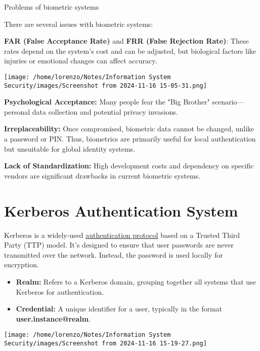 \begin{quotebox-red}{Problems of biometric systems}{
    There are several issues with biometric systems:
    \begin{itemize}
        \begin{minipage}{0.7\textwidth}
        \item \textbf{FAR (False Acceptance Rate)} and \textbf{FRR (False Rejection Rate)}: These rates depend on the system's cost and can be adjusted, but biological factors like injuries or emotional changes can affect accuracy.
        \end{minipage} 
        \hspace{-1.2cm}
        \begin{minipage}{0.4\textwidth}
            \centering
            \texttt{[image: /home/lorenzo/Notes/Information System Security/images/Screenshot from 2024-11-16 15-05-31.png]}
        \end{minipage}
        
        \item \textbf{Psychological Acceptance:} Many people fear the "Big Brother" scenario—personal data collection and potential privacy invasions.
        \item \textbf{Irreplaceability:} Once compromised, biometric data cannot be changed, unlike a password or PIN. Thus, biometrics are primarily useful for local authentication but unsuitable for global identity systems.
        \item \textbf{Lack of Standardization:} High development costs and dependency on specific vendors are significant drawbacks in current biometric systems.
    \end{itemize}}
\end{quotebox-red}
\newpage
\section{Kerberos Authentication System}
\begin{minipage}{0.8\textwidth}
\vspace{-0.5cm}
Kerberos is a widely-used \underline{authentication protocol} based on a Trusted Third Party (TTP) model. It's designed to ensure that user passwords are never transmitted over the network. Instead, the password is used locally for encryption.
\begin{itemize}
    \item \textbf{Realm:} Refers to a Kerberos domain, grouping together all systems that use Kerberos for authentication.
    \item \textbf{Credential:} A unique identifier for a user, typically in the format \textbf{user.instance@realm}.
    \end{itemize}
\end{minipage} 
\hspace{-1.2cm}
\begin{minipage}{0.3\textwidth}
    \centering
    \texttt{[image: /home/lorenzo/Notes/Information System Security/images/Screenshot from 2024-11-16 15-19-27.png]}
\end{minipage}


